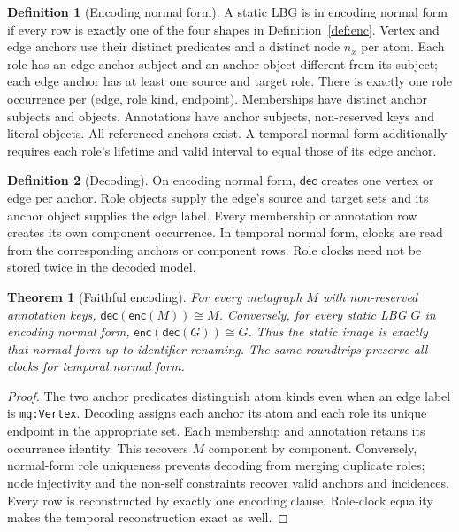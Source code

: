 \documentclass[11pt]{article}
\theoremstyle{plain}
\newtheorem{theorem}{Theorem}
\theoremstyle{definition}
\newtheorem{definition}{Definition}
\theoremstyle{remark}
\newcommand{\enc}{\mathsf{enc}}
\newcommand{\dec}{\mathsf{dec}}
\newcommand{\mg}[1]{\texttt{mg:#1}}
\begin{document}
\begin{definition}[Encoding normal form]
A static LBG is in encoding normal form if every row is exactly one of the four
shapes in Definition~\ref{def:enc}. Vertex and edge anchors use their distinct
predicates and a distinct node $n_x$ per atom. Each role has an edge-anchor
subject and an anchor object different from its subject; each edge anchor has
at least one source and target role. There is exactly one role occurrence per
(edge, role kind, endpoint). Memberships have distinct anchor subjects and
objects. Annotations have anchor subjects, non-reserved keys and literal
objects. All referenced anchors exist. A temporal normal form additionally
requires each role's lifetime and valid interval to equal those of its edge anchor.
\end{definition}

\begin{definition}[Decoding]
On encoding normal form, $\dec$ creates one vertex or edge per anchor. Role
objects supply the edge's source and target sets and its anchor object supplies
the edge label. Every membership or annotation row creates its own component
occurrence. In temporal normal form, clocks are read from the corresponding
anchors or component rows. Role clocks need not be stored twice in the decoded model.
\end{definition}

\begin{theorem}[Faithful encoding]\label{thm:faithful}
For every metagraph $M$ with non-reserved annotation keys,
$\dec(\enc(M))\cong M$. Conversely, for every static LBG $G$ in encoding normal
form, $\enc(\dec(G))\cong G$. Thus the static image is exactly that normal
form up to identifier renaming. The same roundtrips preserve all clocks for
temporal normal form.
\end{theorem}

\begin{proof}
The two anchor predicates distinguish atom kinds even when an edge label is
\mg{Vertex}. Decoding assigns each anchor its atom and each role its unique
endpoint in the appropriate set. Each membership and annotation retains its
occurrence identity. This recovers $M$ component by component. Conversely,
normal-form role uniqueness prevents decoding from merging duplicate roles;
node injectivity and the non-self constraints recover valid anchors and incidences.
Every row is reconstructed by exactly one encoding clause. Role-clock equality
makes the temporal reconstruction exact as well.
\end{proof}
\end{document}
